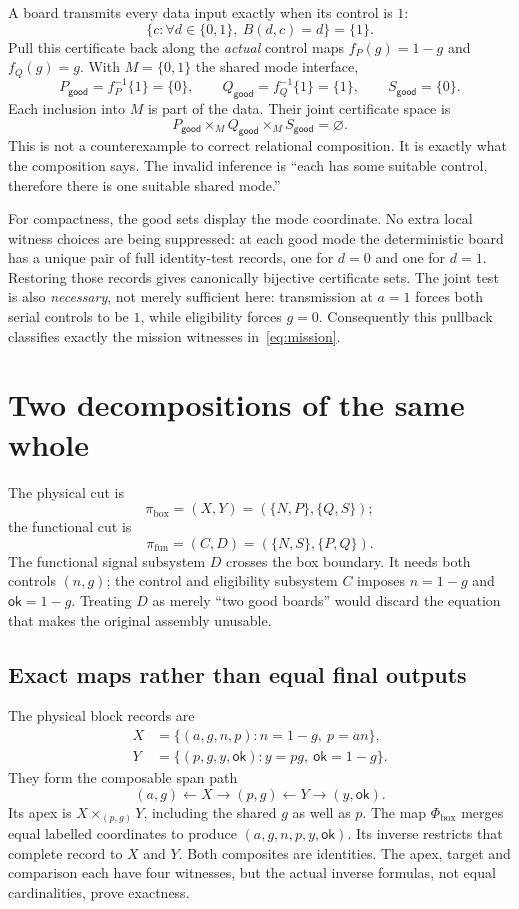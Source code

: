 \documentclass[11pt]{article}
\newcommand{\B}{\{0,1\}}
\newcommand{\ok}{\mathsf{ok}}
\newcommand{\good}{\mathsf{good}}
\begin{document}
A board transmits every data input exactly when its control is $1$:
\[
 \{c:\forall d\in\B,\ B(d,c)=d\}=\{1\}.
\]
Pull this certificate back along the \emph{actual} control maps
$f_P(g)=1-g$ and $f_Q(g)=g$. With $M=\B$ the shared mode interface,
\begin{equation}\label{eq:good}
 P_{\good}=f_P^{-1}\{1\}=\{0\},\qquad
 Q_{\good}=f_Q^{-1}\{1\}=\{1\},\qquad
 S_{\good}=\{0\}.
\end{equation}
Each inclusion into $M$ is part of the data. Their joint certificate space is
\[
 P_{\good}\times_M Q_{\good}\times_M S_{\good}
 =\varnothing.
\]
This is not a counterexample to correct relational composition. It is exactly
what the composition says. The invalid inference is
``each has some suitable control, therefore there is one suitable shared mode.''

For compactness, the good sets display the mode coordinate. No extra local
witness choices are being suppressed: at each good mode the deterministic board
has a unique pair of full identity-test records, one for $d=0$ and one for
$d=1$. Restoring those records gives canonically bijective certificate sets.
The joint test is also \emph{necessary}, not merely sufficient here: transmission
at $a=1$ forces both serial controls to be $1$, while eligibility forces $g=0$.
Consequently this pullback classifies exactly the mission witnesses
in~\eqref{eq:mission}.

\section{Two decompositions of the same whole}

The physical cut is
\[
 \pi_{\mathrm{box}}=(X,Y)=(\{N,P\},\{Q,S\});
\]
the functional cut is
\[
 \pi_{\mathrm{fun}}=(C,D)=(\{N,S\},\{P,Q\}).
\]
The functional signal subsystem $D$ crosses the box boundary. It needs both
controls $(n,g)$; the control and eligibility subsystem $C$ imposes
$n=1-g$ and $\ok=1-g$. Treating $D$ as merely ``two good boards'' would discard
the equation that makes the original assembly unusable.

\subsection{Exact maps rather than equal final outputs}

The physical block records are
\[
\begin{aligned}
 X&=\{(a,g,n,p):n=1-g,\ p=an\},\\
 Y&=\{(p,g,y,\ok):y=pg,\ \ok=1-g\}.
\end{aligned}
\]
They form the composable span path
\[
 (a,g)\xleftarrow{}X\xrightarrow{}(p,g)
       \xleftarrow{}Y\xrightarrow{}(y,\ok).
\]
Its apex is $X\times_{(p,g)}Y$, including the shared $g$ as well as $p$.
The map $\Phi_{\mathrm{box}}$ merges equal labelled coordinates to produce
$(a,g,n,p,y,\ok)$. Its inverse restricts that complete record to $X$ and $Y$.
Both composites are identities. The apex, target and comparison each have four
witnesses, but the actual inverse formulas, not equal cardinalities, prove
exactness.
\end{document}
